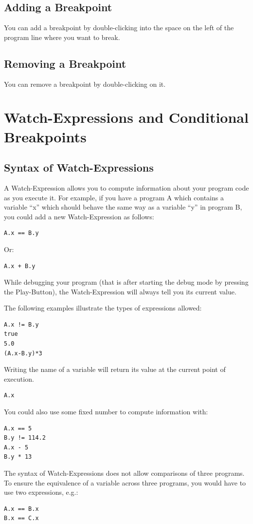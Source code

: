 \documentclass[parskip=full]{memoir}
\begin{document}
\section{Adding a Breakpoint}
You can add a breakpoint by double-clicking into the space on the left of the program line where you want to break.

\section{Removing a Breakpoint}
You can remove a breakpoint by double-clicking on it.

\chapter{Watch-Expressions and Conditional Breakpoints}
\section{Syntax of Watch-Expressions}
A Watch-Expression allows you to compute information about your program code as you execute it.
For example, if you have a program A which contains a variable \enquote{x} which should behave the same way as a variable \enquote{y} in program B, you could add a new Watch-Expression as follows:
\begin{verbatim}
A.x == B.y
\end{verbatim}
Or:
\begin{verbatim}
A.x + B.y
\end{verbatim}

While debugging your program (that is after starting the debug mode by pressing the Play-Button), the Watch-Expression will always tell you its current value.

The following examples illustrate the types of expressions allowed:
\begin{verbatim}
A.x != B.y
true
5.0
(A.x-B.y)*3
\end{verbatim}

Writing the name of a variable will return its value at the current point of execution.
\begin{verbatim}
A.x
\end{verbatim}

You could also use some fixed number to compute information with:
\begin{verbatim}
A.x == 5
B.y != 114.2
A.x - 5
B.y * 13
\end{verbatim}

The syntax of Watch-Expressions does not allow comparisons of three programs. To ensure the equivalence of a variable across three programs, you would have to use two expressions, e.g.:
\begin{verbatim}
A.x == B.x
B.x == C.x
\end{verbatim}
\end{document}
